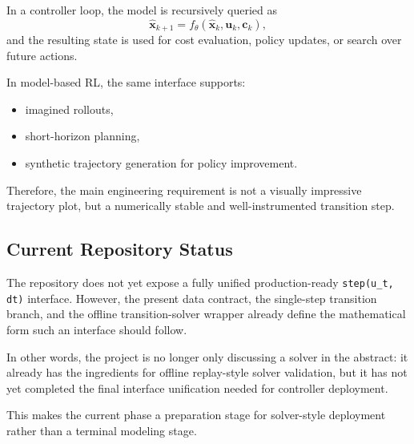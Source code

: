 In a controller loop, the model is recursively queried as
\begin{equation}
\hat{\mathbf{x}}_{k+1}
=
f_{\theta}\!\left(\hat{\mathbf{x}}_{k}, \mathbf{u}_{k}, \mathbf{c}_{k}\right),
\end{equation}
and the resulting state is used for cost evaluation, policy updates, or search over future actions.

In model-based RL, the same interface supports:
\begin{itemize}
  \item imagined rollouts,
  \item short-horizon planning,
  \item synthetic trajectory generation for policy improvement.
\end{itemize}

Therefore, the main engineering requirement is not a visually impressive trajectory plot, but a numerically stable and well-instrumented transition step.

\subsection{Current Repository Status}

The repository does not yet expose a fully unified production-ready \texttt{step(u\_t, dt)} interface.
However, the present data contract, the single-step transition branch, and the offline transition-solver wrapper already define the mathematical form such an interface should follow.

In other words, the project is no longer only discussing a solver in the abstract:
it already has the ingredients for offline replay-style solver validation,
but it has not yet completed the final interface unification needed for controller deployment.

This makes the current phase a preparation stage for solver-style deployment rather than a terminal modeling stage.
